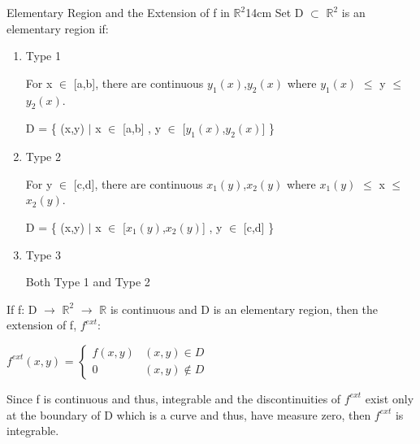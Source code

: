     \begin{definition}{Elementary Region and the Extension of f
    in $\mathbb{R}^2$}{14cm}
        Set D $\subset$ $\mathbb{R}^2$ is an {\color{lblue} elementary region} if:

        \begin{enumerate}[label=(\alph*), leftmargin=1cm, itemsep=0.1cm]
            \item {\color{red} Type 1}

                For x $\in$ [a,b], there are continuous $y_1(x)$,$y_2(x)$ where
                $y_1(x)$ $\leq$ y $\leq$ $y_2(x)$.

                \hspace{0.5cm}
                D = \{ (x,y) $|$ x $\in$ [a,b] , y $\in$ [$y_1(x)$,$y_2(x)$] \}

            \item {\color{red} Type 2}

                For y $\in$ [c,d], there are continuous $x_1(y)$,$x_2(y)$ where
                $x_1(y)$ $\leq$ x $\leq$ $x_2(y)$.

                \hspace{0.5cm}
                D = \{ (x,y) $|$ x $\in$ [$x_1(y)$,$x_2(y)$] , y $\in$ [c,d] \}

            \item {\color{red} Type 3}
            
                Both Type 1 and Type 2
        \end{enumerate}

        \vspace{0.3cm}

        If f: D $\rightarrow$ $\mathbb{R}^2$ $\rightarrow$ $\mathbb{R}$
        is continuous and D is an elementary region, then
        the extension of f, $f^{ext}$:

        \hspace{0.5cm}
        $f^{ext}(x,y)$ =
        $
        \begin{cases}
            f(x,y) & (x,y) \in D \\
            0 & (x,y) \not \in D
        \end{cases}
        $

        Since f is continuous and thus, integrable and the discontinuities of
        $f^{ext}$ exist only at the boundary of D which is a curve and thus,
        have measure zero, then $f^{ext}$ is integrable.
    \end{definition}

